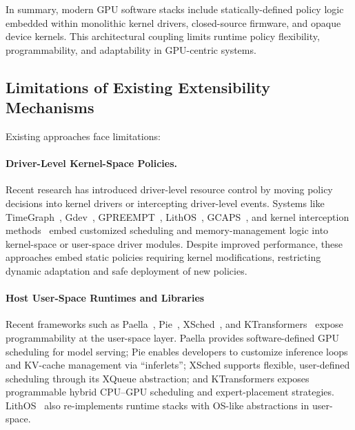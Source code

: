 In summary, modern GPU software stacks include statically-defined policy logic embedded within monolithic kernel drivers, closed-source firmware, and opaque device kernels. This architectural coupling limits runtime policy flexibility, programmability, and adaptability in GPU-centric systems.

\subsection{Limitations of Existing Extensibility Mechanisms}


Existing approaches face limitations:

\paragraph{Driver-Level Kernel-Space Policies.}

Recent research has introduced driver-level resource control by moving policy decisions into kernel drivers or intercepting driver-level events. Systems like TimeGraph~\cite{kato2011timegraph}, Gdev~\cite{kato2012gdev}, GPREEMPT~\cite{fan2025gpreempt}, LithOS~\cite{coppock2025lithos}, GCAPS~\cite{wang2024gcaps}, and kernel interception methods~\cite{kernelintercept} embed customized scheduling and memory-management logic into kernel-space or user-space driver modules. Despite improved performance, these approaches embed static policies requiring kernel modifications, restricting dynamic adaptation and safe deployment of new policies.

\paragraph{Host User-Space Runtimes and Libraries}
Recent frameworks such as Paella~\cite{ng2023paella}, Pie~\cite{gim2025pie}, XSched~\cite{shen2025xsched}, and KTransformers~\cite{chen2025ktransformers} expose programmability at the user-space layer. Paella provides software-defined GPU scheduling for model serving; Pie enables developers to customize inference loops and KV-cache management via ``inferlets''; XSched supports flexible, user-defined scheduling through its XQueue abstraction; and KTransformers exposes programmable hybrid CPU–GPU scheduling and expert-placement strategies. LithOS~\cite{coppock2025lithos} also re-implements runtime stacks with OS-like abstractions in user-space.

